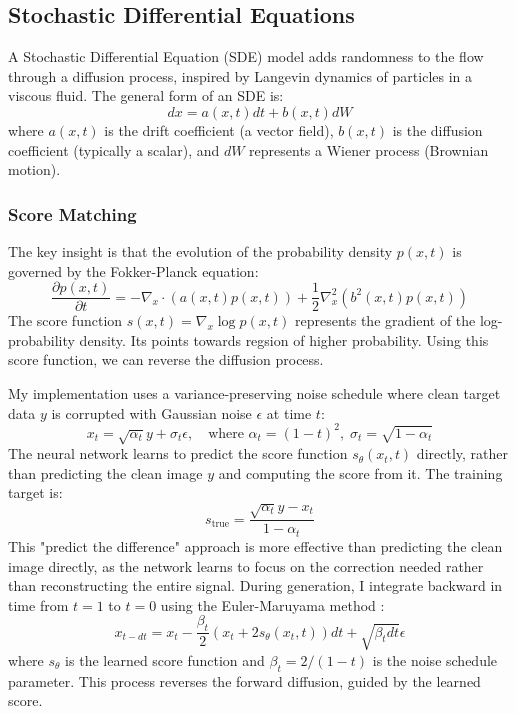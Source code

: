 \documentclass[conference,a4paper]{IEEEtran}
\begin{document}
\subsection{Stochastic Differential Equations}

A Stochastic Differential Equation (SDE) model \cite{songScoreBasedGenerativeModeling2021} adds randomness to the flow through a diffusion process, inspired by Langevin dynamics of particles in a viscous fluid. The general form of an SDE is:
\begin{equation}
    dx = a(x, t)dt + b(x, t)dW
\end{equation}
where $a(x, t)$ is the drift coefficient (a vector field), $b(x, t)$ is the diffusion coefficient (typically a scalar), and $dW$ represents a Wiener process (Brownian motion).

\subsubsection{Score Matching} The key insight is that the evolution of the probability density $p(x, t)$ is governed by the Fokker-Planck equation:
\begin{equation}
    \frac{\partial p(x, t)}{\partial t} = -\nabla_x \cdot (a(x, t)p(x, t)) + \frac{1}{2}\nabla^2_x(b^2(x, t)p(x, t))
\end{equation}
The score function $s(x, t) = \nabla_x \log p(x, t)$ represents the gradient of the log-probability density. Its points towards regsion of higher probability. Using this score function, we can reverse the diffusion process.

My implementation uses a variance-preserving noise schedule where clean target data $y$ is corrupted with Gaussian noise $\epsilon$ at time $t$:
\begin{equation}
    x_t = \sqrt{\alpha_t}y + \sigma_t\epsilon, \quad \text{where } \alpha_t = (1-t)^2, \; \sigma_t = \sqrt{1 - \alpha_t}
\end{equation}
The neural network learns to predict the score function $s_\theta(x_t, t)$ directly, rather than predicting the clean image $y$ and computing the score from it. The training target is:
\begin{equation}
    s_{\text{true}} = \frac{\sqrt{\alpha_t}y - x_t}{1 - \alpha_t}
\end{equation}
This "predict the difference" approach is more effective than predicting the clean image directly, as the network learns to focus on the correction needed rather than reconstructing the entire signal. During generation, I integrate backward in time from $t=1$ to $t=0$ using the Euler-Maruyama method \cite{burdenNumericalAnalysis2016}:
\begin{equation}
    x_{t-dt} = x_t - \frac{\beta_t}{2}(x_t + 2s_\theta(x_t, t))dt + \sqrt{\beta_t dt}\epsilon
\end{equation}
where $s_\theta$ is the learned score function and $\beta_t = 2/(1-t)$ is the noise schedule parameter. This process reverses the forward diffusion, guided by the learned score.
\end{document}
